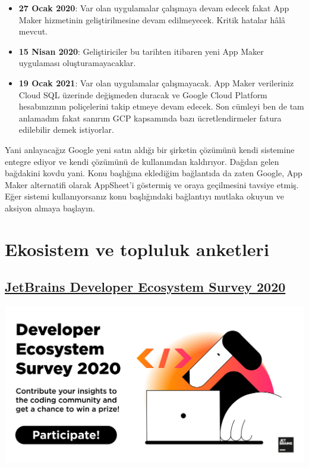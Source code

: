 \documentclass[11pt]{article}
\begin{document}
\begin{itemize}
\item \textbf{27 Ocak 2020}: Var olan uygulamalar çalışmaya devam edecek fakat App Maker
hizmetinin geliştirilmesine devam edilmeyecek. Kritik hatalar hâlâ mevcut.
\item \textbf{15 Nisan 2020}: Geliştiriciler bu tarihten itibaren yeni App Maker
uygulaması oluşturamayacaklar.
\item \textbf{19 Ocak 2021}: Var olan uygulamalar çalışmayacak. App Maker verileriniz
Cloud SQL üzerinde değişmeden duracak ve Google Cloud Platform
hesabınızının poliçelerini takip etmeye devam edecek. Son cümleyi ben de
tam anlamadım fakat sanırım GCP kapsamında bazı ücretlendirmeler fatura
edilebilir demek istiyorlar.
\end{itemize}

Yani anlayacağız Google yeni satın aldığı bir şirketin çözümünü kendi
sistemine entegre ediyor ve kendi çözümünü de kullanımdan kaldırıyor. Dağdan
gelen bağdakini kovdu yani. Konu başlığına eklediğim bağlantıda da zaten
Google, App Maker alternatifi olarak AppSheet'i göstermiş ve oraya geçilmesini
tavsiye etmiş. Eğer sistemi kullanıyorsanız konu başlığındaki bağlantıyı
mutlaka okuyun ve aksiyon almaya başlayın.
\section{Ekosistem ve topluluk anketleri}
\label{sec:orgcdd1d16}
\subsection{\href{https://surveys.jetbrains.com/s3/developer-ecosystem-survey-2020-sh}{JetBrains Developer Ecosystem Survey 2020}}
\label{sec:orgda3e9e3}
\begin{center}
\includegraphics[width=.9\linewidth]{gorseller/jetbrains-anket.png}
\end{center}
\end{document}
